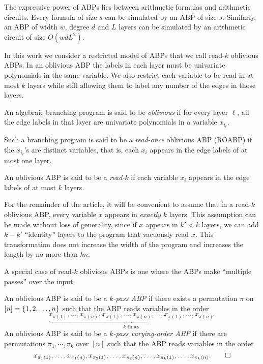 \documentclass[11pt]{article}
\begin{document}
The expressive power of ABPs lies between arithmetic formulas and arithmetic circuits.
Every formula of size $s$ can be simulated by an ABP of size $s$.
Similarly, an ABP of width $w$, degree $d$ and $L$ layers can be simulated by an arithmetic circuit of size $O(wdL^2)$.

In this work we consider a restricted model of ABPs that we call read-$k$ oblivious ABPs.
In an oblivious ABP the labels in each layer must be univariate polynomials in the same variable.
We also restrict each variable to be read in at most $k$ layers while still allowing them to label any number of the edges in those layers.

\begin{definition}
\label{defn:read-k-abp}
  An algebraic branching program is said to be \emph{oblivious} if for every layer $\ell$, all the edge labels in that layer are univariate polynomials in a variable $x_{i_\ell}$.

Such a branching program is said to be a \emph{read-once} oblivious ABP (ROABP) if the $x_{i_\ell}$'s are distinct variables, that is, each $x_i$ appears in the edge labels of at most one layer.

An oblivious ABP is said to be a \emph{read-$k$} if each variable $x_i$ appears in the edge labels of at most $k$ layers. 
\end{definition}

\begin{remark}
\label{rem:exactly-k}
For the remainder of the article, it will be convenient to assume that in a read-$k$ oblivious ABP, every variable $x$ appears in {\em exactly} $k$ layers.
This assumption can be made without loss of generality, since if $x$ appears in $k' < k$ layers, we can add $k-k'$ ``identity'' layers to the program that vacuously read $x$.
This transformation does not increase the width of the program and increases the length by no more than $kn$.
\end{remark}

A special case of read-$k$ oblivious ABPs is one where the ABPs make ``multiple passes'' over the input.

\begin{definition}
\label{defn:k-pass-abp}
An oblivious ABP is said to be a \emph{$k$-pass ABP} if there exists a permutation $\pi$ on $[n] = \left\{ 1,2,\ldots,n \right\}$ such that the ABP reads variables in the order
\[
\underbrace{x_{\pi(1)}, \ldots, x_{\pi(n)}, x_{\pi(1)}, \ldots, x_{\pi(n)}, \ldots, x_{\pi(1)}, \ldots, x_{\pi(n)}}_{\text{$k$ times}}.
\]
An oblivious ABP is said to be a \emph{$k$-pass varying-order ABP} if there are permutations $\pi_1, \cdots, \pi_k$ over $[n]$ such that the ABP reads variables in the order
\[
x_{\pi_1(1)}, \ldots, x_{\pi_1(n)}, x_{\pi_2(1)}, \ldots, x_{\pi_2(n)}, \ldots, x_{\pi_k(1)}, \ldots, x_{\pi_k(n)}.\qedhere
\]
\end{definition}
\end{document}
